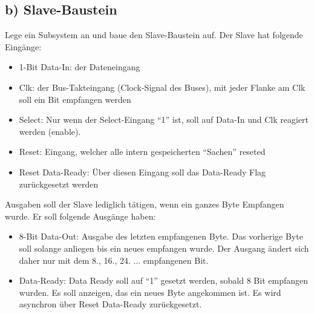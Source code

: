 \documentclass[a4paper]{scrartcl}
\begin{document}
\subsection*{b) Slave-Baustein}
Lege ein Subsystem an und baue den Slave-Baustein auf. Der Slave hat folgende Eingänge:
\begin{itemize}
  \item 1-Bit Data-In: der Dateneingang
  \item Clk: der Bus-Takteingang (Clock-Signal des Buses), mit jeder Flanke am Clk soll ein Bit empfangen werden
  \item Select: Nur wenn der Select-Eingang ``1'' ist, soll auf Data-In und Clk reagiert werden (enable).
  \item Reset: Eingang, welcher alle intern gespeicherten ``Sachen'' reseted
  \item Reset Data-Ready: Über diesen Eingang soll das Data-Ready Flag zurückgesetzt werden
\end{itemize}
Ausgaben soll der Slave lediglich tätigen, wenn ein ganzes Byte Empfangen wurde. Er soll folgende Ausgänge haben:
\begin{itemize}
  \item 8-Bit Data-Out: Ausgabe des letzten empfangenen Byte. Das vorherige Byte soll solange anliegen bis ein neues empfangen wurde. Der Ausgang
  ändert sich daher nur mit dem 8., 16., 24. ... empfangenen Bit.
  \item Data-Ready: Data Ready soll auf ``1''
   gesetzt werden, sobald 8 Bit empfangen wurden. Es soll anzeigen, das ein neues Byte angekommen ist. Es wird asynchron über Reset Data-Ready zurückgesetzt.
\end{itemize}
\end{document}
